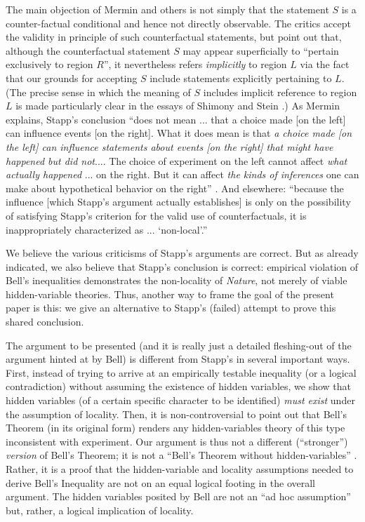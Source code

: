 \documentclass[aps,prc,onecolumn,12pt,nofootinbib]{revtex4-2}
\begin{document}
The main objection of Mermin and others is not
simply that the statement $S$ is a counter-factual conditional and
hence not directly observable.  The critics accept the validity in
principle of such counterfactual statements, but point out that,
although the counterfactual statement $S$ may appear superficially to
``pertain exclusively to region $R$'', it nevertheless refers
\emph{implicitly} to region $L$ via the fact that our grounds for
accepting $S$ include statements explicitly pertaining to $L$.
(The precise
sense in which the meaning of $S$ includes implicit
reference to region $L$ is
made particularly clear in the essays of Shimony and
Stein \cite{shimony,shimonystein}.)    As Mermin explains,
Stapp's conclusion ``does not mean ... that a choice
  made [on the left] can influence events [on the right].  What it
  does mean is that \emph{a choice made [on the left] can influence
  statements about events [on the right] that might have happened but
  did not}....  The choice of experiment on the left cannot affect
  \emph{what actually happened} ... on the right.  But it can affect
  \emph{the kinds of inferences} one can make about hypothetical
  behavior on the right'' \cite{mermin}.  And elsewhere:  ``because the
  influence [which Stapp's argument actually establishes] is only on
  the possibility of satisfying Stapp's criterion for the valid use
  of counterfactuals, it is inappropriately characterized as ...
  `non-local'.'' \cite{mermin2}

We believe the various criticisms of Stapp's arguments are correct.
But as already indicated, we also believe that Stapp's conclusion is correct:
empirical violation of
Bell's inequalities demonstrates the non-locality of \emph{Nature}, not
merely of viable hidden-variable theories.  Thus, another way to frame
the goal of the present paper is this:  we give an alternative to
Stapp's (failed) attempt to prove this shared conclusion.

The argument to be presented (and it is really just a detailed
fleshing-out of the argument hinted at by Bell)
is different from Stapp's in several
important ways.  First, instead of trying to arrive at an empirically
testable inequality (or a logical contradiction) without
assuming the existence of hidden
variables, we show that hidden variables (of a certain specific
character to be identified) \emph{must exist} under the assumption of
locality.  Then, it is non-controversial to point out that Bell's
Theorem (in its original form) renders any hidden-variables theory
of this type
inconsistent with experiment.  Our argument is thus not a different
(``stronger'') \emph{version} of Bell's Theorem; it is not a ``Bell's
Theorem without hidden-variables'' \cite{bellwohv}.
Rather, it is a proof that the hidden-variable and locality
assumptions needed to derive Bell's Inequality are not on an equal
logical footing in the overall argument.
The hidden variables posited by Bell are
not an ``ad hoc assumption'' but, rather, a logical implication
of locality.
\end{document}
